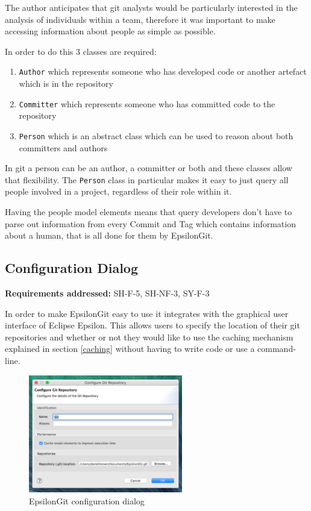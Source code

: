 \documentclass[11pt]{book}
\newcommand{\code}[1]{\texttt{#1}}
\begin{document}
The author anticipates that git analysts would be particularly interested in the analysis of individuals within a team, therefore it was important to make accessing information about people as simple as possible. 

In order to do this 3 classes are required:
\begin{enumerate}
	\item \code{Author} which represents someone who has developed code or another artefact which is in the repository
	\item \code{Committer} which represents someone who has committed code to the repository
	\item \code{Person} which is an abstract class which can be used to reason about both committers and authors
\end{enumerate}

In git a person can be an author, a committer or both and these classes allow that flexibility. The \code{Person} class in particular makes it easy to just query all people involved in a project, regardless of their role within it.

Having the people model elements means that query developers don't have to parse out information from every Commit and Tag which contains information about a human, that is all done for them by EpsilonGit.

\clearpage

\subsection{Configuration Dialog}
\begin{tcolorbox}
\textbf{Requirements addressed:} SH-F-5, SH-NF-3, SY-F-3
\end{tcolorbox}

In order to make EpsilonGit easy to use it integrates with the graphical user interface of Eclipse Epsilon. This allows users to specify the location of their git repositories and whether or not they would like to use the caching mechanism explained in section \ref{caching} without having to write code or use a command-line.

\begin{figure}[h]
	\centering
	\includegraphics[width=0.6\textwidth]{images/configurationdialog}
	\caption{EpsilonGit configuration dialog}
	\label{fig:configurationdialog}
\end{figure}
\end{document}
